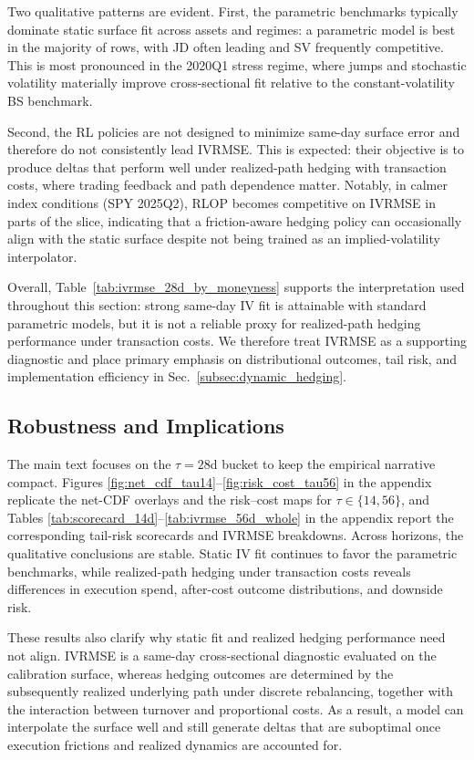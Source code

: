 Two qualitative patterns are evident.
First, the parametric benchmarks typically dominate static surface fit across assets and regimes: a parametric model is best in the majority of rows, with JD
often leading and SV frequently competitive.
This is most pronounced in the 2020Q1 stress regime, where jumps and stochastic volatility materially improve cross-sectional fit relative to the constant-volatility
BS benchmark.

Second, the RL policies are not designed to minimize same-day surface error and therefore do not consistently lead IVRMSE.
This is expected: their objective is to produce deltas that perform well under realized-path hedging with transaction costs, where trading feedback and
path dependence matter.
Notably, in calmer index conditions (SPY 2025Q2), RLOP becomes competitive on IVRMSE in parts of the slice, indicating that a friction-aware hedging policy can
occasionally align with the static surface despite not being trained as an implied-volatility interpolator.

Overall, Table~\ref{tab:ivrmse_28d_by_moneyness} supports the interpretation used throughout this section:
strong same-day IV fit is attainable with standard parametric models, but it is not a reliable proxy for realized-path hedging performance under transaction costs.
We therefore treat IVRMSE as a supporting diagnostic and place primary emphasis on distributional outcomes, tail risk, and implementation efficiency in
Sec.~\ref{subsec:dynamic_hedging}.


\subsection{Robustness and Implications}
\label{subsec:robustness_implications}

The main text focuses on the $\tau=28$d bucket to keep the empirical narrative compact.
Figures \ref{fig:net_cdf_tau14}--\ref{fig:risk_cost_tau56} in the appendix replicate the net-CDF overlays and the risk--cost maps for $\tau\in\{14,56\}$, and Tables \ref{tab:scorecard_14d}--\ref{tab:ivrmse_56d_whole} in the appendix report the corresponding
tail-risk scorecards and IVRMSE breakdowns.
Across horizons, the qualitative conclusions are stable.
Static IV fit continues to favor the parametric benchmarks, while realized-path hedging under transaction costs reveals differences in execution spend,
after-cost outcome distributions, and downside risk.

These results also clarify why static fit and realized hedging performance need not align. IVRMSE is a same-day cross-sectional diagnostic evaluated on the calibration surface, whereas hedging outcomes are determined by the subsequently realized
underlying path under discrete rebalancing, together with the interaction between turnover and proportional costs.
As a result, a model can interpolate the surface well and still generate deltas that are suboptimal once execution frictions and realized dynamics are
accounted for.

